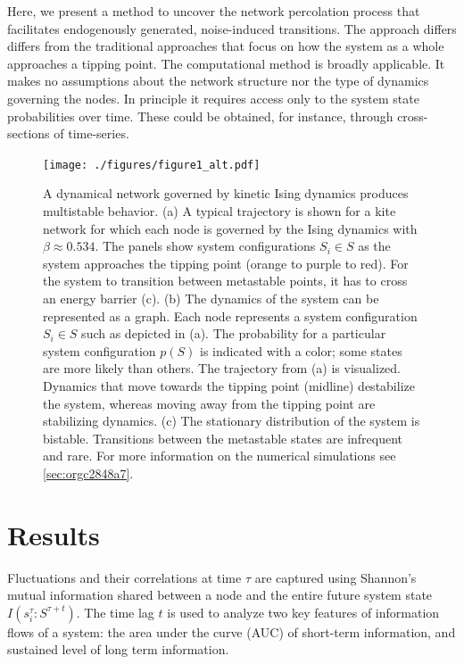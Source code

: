 \documentclass[a4paper, 11pt, twocolumn]{article}
\begin{document}
Here, we present a method to uncover the network percolation
process    that    facilitates    endogenously    generated,
noise-induced transitions. The approach differs differs from
the traditional approaches that focus on how the system as a
whole approaches  a tipping point. The  computational method
is  broadly applicable.  It makes  no assumptions  about the
network  structure nor  the type  of dynamics  governing the
nodes. In  principle it requires  access only to  the system
state probabilities over time.  These could be obtained, for
instance, through cross-sections of time-series.

\begin{figure}
\centering
\texttt{[image: ./figures/figure1\_alt.pdf]}
\caption{\label{fig:introduction}A dynamical network governed by kinetic Ising dynamics produces multistable behavior. (a) A typical trajectory is shown for a kite network for which each node is governed by the Ising dynamics with \(\beta \approx 0.534\). The panels show system configurations \(S_i \in S\) as the system approaches the tipping point (orange to purple to red). For the system to transition between metastable points, it has to cross an energy barrier (c). (b) The dynamics of the system can be represented as a graph. Each node represents a system configuration \(S_i \in S\) such as depicted in (a). The probability for a particular system configuration \(p(S)\) is indicated with a color; some states are more likely than others. The trajectory from (a) is visualized. Dynamics that move towards the tipping point (midline) destabilize the system, whereas moving away from the tipping point are stabilizing dynamics. (c) The stationary distribution of the system is bistable. Transitions between the metastable states are infrequent and rare. For more information on the numerical simulations see \ref{sec:orgc2848a7}.}
\end{figure}

\section{Results}
\label{sec:org6f0b033}
Fluctuations and their correlations at time \(\tau\) are captured
using  Shannon's  mutual information  \cite{Cover2005}  shared
between  a   node  and   the  entire  future   system  state
\(I(s_i^{\tau}  : S^{\tau  +  t})\). The  time lag  \(t\)  is used  to
analyze two key  features of information flows  of a system:
the area  under the  curve (AUC) of  short-term information,
and sustained level of long term information.
\end{document}
